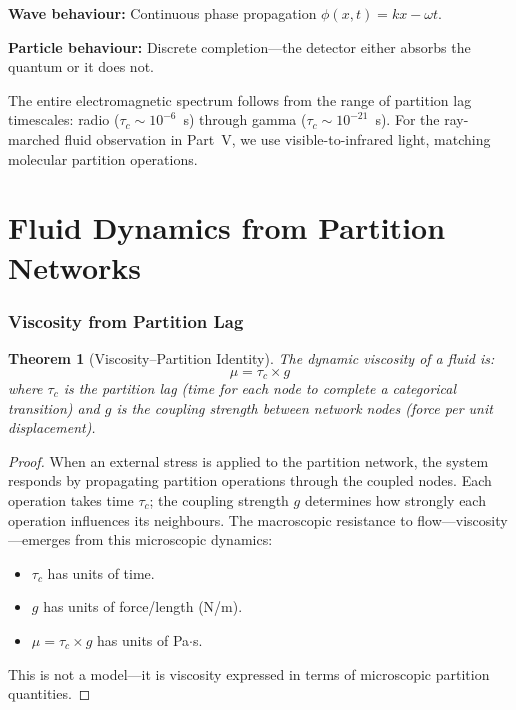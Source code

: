\documentclass[twocolumn,10pt,a4paper]{article}
\theoremstyle{plain}
\newtheorem{theorem}{Theorem}[section]
\theoremstyle{definition}
\theoremstyle{remark}
\newcommand{\tauc}{\tau_c}
\begin{document}
\textbf{Wave behaviour:} Continuous phase propagation $\phi(x,t) = kx - \omega t$.

\textbf{Particle behaviour:} Discrete completion---the detector either absorbs the quantum or it does not.

The entire electromagnetic spectrum follows from the range of partition lag timescales: radio ($\tauc \sim 10^{-6}$~s) through gamma ($\tauc \sim 10^{-21}$~s). For the ray-marched fluid observation in Part~V, we use visible-to-infrared light, matching molecular partition operations.


\part{Fluid Dynamics from Partition Networks}
\label{part:fluid}

\section{Viscosity from Partition Lag}
\label{sec:viscosity}

\begin{theorem}[Viscosity--Partition Identity]
\label{thm:viscosity}
The dynamic viscosity of a fluid is:
\begin{equation}
\boxed{\mu = \tauc \times g}
\end{equation}
where $\tauc$ is the partition lag (time for each node to complete a categorical transition) and $g$ is the coupling strength between network nodes (force per unit displacement).
\end{theorem}

\begin{proof}
When an external stress is applied to the partition network, the system responds by propagating partition operations through the coupled nodes. Each operation takes time $\tauc$; the coupling strength $g$ determines how strongly each operation influences its neighbours. The macroscopic resistance to flow---viscosity---emerges from this microscopic dynamics:
\begin{itemize}
    \item $\tauc$ has units of time.
    \item $g$ has units of force/length (N/m).
    \item $\mu = \tauc \times g$ has units of Pa$\cdot$s.
\end{itemize}
This is not a model---it is viscosity expressed in terms of microscopic partition quantities.
\end{proof}
\end{document}
